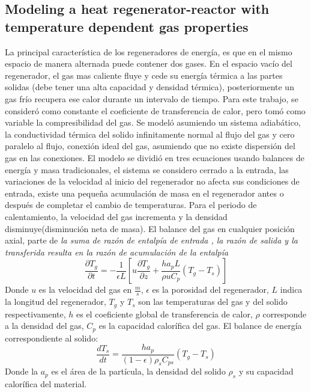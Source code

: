 \documentclass[12pt,letterpaper,final]{article}%
\begin{document}
\subsection*{Modeling a heat regenerator-reactor with temperature dependent gas properties}
La principal característica de los regeneradores de energía, es que en el mismo espacio de manera alternada puede contener dos gases. En el espacio vacío del regenerador, el gas mas caliente fluye y cede su energía térmica a las partes solidas (debe tener una alta capacidad y densidad térmica), posteriormente un gas frío recupera ese calor durante un intervalo de tiempo. Para este trabajo, se consideró como constante el coeficiente de transferencia de calor, pero tomó como variable la compresibilidad del gas. Se modeló asumiendo un sistema adiabático, la conductividad térmica del solido infinitamente normal al flujo del gas y cero paralelo al flujo, conexión ideal del gas, asumiendo que no existe dispersión del gas en las conexiones. El modelo se dividió en tres ecuaciones usando balances de energía y masa tradicionales, el sistema se considero cerrado a la entrada, las variaciones de la velocidad al inicio del regenerador no afecta sus condiciones de entrada, existe una pequeña acumulación de masa en el regenerador antes o después de completar el cambio de temperaturas. Para el periodo de calentamiento, la velocidad del gas incrementa y la densidad disminuye(disminución neta de masa). El balance del gas en cualquier posición axial, parte de \textit{la suma de razón de entalpía de entrada , la razón de salida y la transferida resulta en la razón de acumulación de la entalpía}\cite{Kulkarni1992} 
\begin{equation}
	\frac{\partial T_g}{\partial t} = -\frac{1}{\epsilon L}[u\frac{\partial T_g}{\partial z}+ \frac{ha_p L}{\rho u C_p}(T_g-T_s)]
\end{equation}
Donde $u$ es la velocidad del gas en $\frac{m}{s}$, $\epsilon$ es la porosidad del regenerador, $L$ indica la longitud del regenerador, $T_g$ y $T_s$ son las temperaturas del gas y del solido respectivamente, $h$ es el coeficiente global de transferencia de calor, $\rho$ corresponde a la densidad del gas, $C_p$ es la capacidad calorífica del gas. 
\newline
El balance de energía correspondiente al solido:
\begin{equation}
	\frac{dT_s}{dt} = \frac{ha_p}{(1-\epsilon)\rho_s C_{ps}}(T_g-T_s)
\end{equation}
Donde la $a_p$ es el área de la partícula, la densidad del solido $\rho_s$ y su capacidad calorífica del material.  
\end{document}
